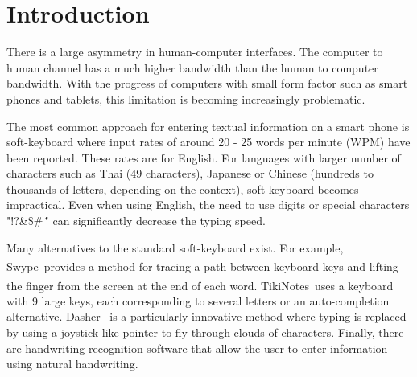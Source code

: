 \documentclass{sigchi}
\begin{document}



\section{Introduction}

There is a large asymmetry in human-computer interfaces. The computer
to human channel has a much higher bandwidth than the human to
computer bandwidth. With the progress of computers with small form
factor such as smart phones and tablets, this limitation is becoming
increasingly problematic.

The most common approach for entering textual information on a smart
phone is soft-keyboard where input rates of around 20 - 25 words
per minute (WPM) have been reported\cite{Arif2009,
  Castellucci2011}. These rates are for English. For languages with
larger number of characters such as Thai (49 characters), Japanese or
Chinese (hundreds to thousands of letters, depending on the context),
soft-keyboard becomes impractical. Even when using English, the need
to use digits or special characters "!?\&\$\#\@\;\:\,\." can
significantly decrease the typing speed.

\newcommand{\tm}{\textsuperscript{\textregistered}~}

Many alternatives to the standard soft-keyboard exist. For example,
Swype\tm provides a method for tracing a path between keyboard keys
and lifting the finger from the screen at the end of each
word. TikiNotes\tm uses a keyboard with 9 large keys, each
corresponding to several letters or an auto-completion
alternative. Dasher~\cite{Garrett2003} is a particularly innovative
method where typing is replaced by using a joystick-like pointer to
fly through clouds of characters. Finally, there are handwriting
recognition software that allow the user to enter information using
natural handwriting.
\end{document}
